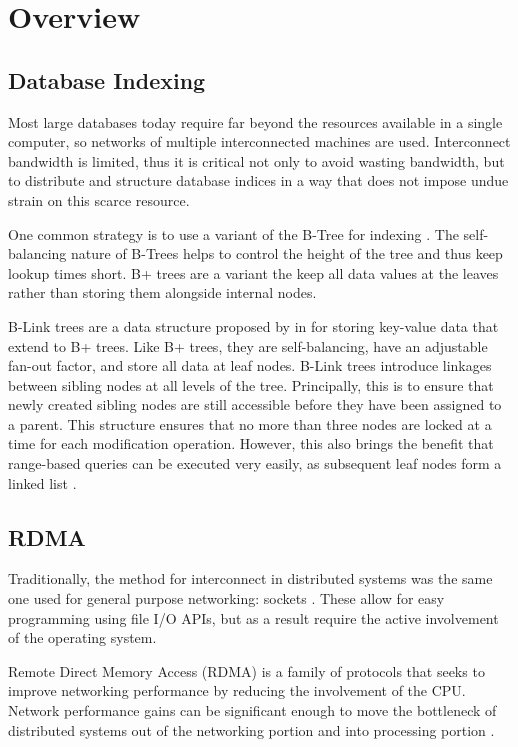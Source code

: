 \section{Overview}

\subsection{Database Indexing}
Most large databases today require far beyond the resources available in a single computer, so networks of multiple interconnected machines are used. Interconnect bandwidth is limited, thus it is critical not only to avoid wasting bandwidth, but to distribute and structure database indices in a way that does not impose undue strain on this scarce resource.

One common strategy is to use a variant of the B-Tree for indexing \autocite{ma-tpds-2022}. The self-balancing nature of B-Trees helps to control the height of the tree and thus keep lookup times short. B+ trees are a variant the keep all data values at the leaves rather than storing them alongside internal nodes.

B-Link trees are a data structure proposed by \citeauthor{b-link} in \citeyear{b-link} for storing key-value data that extend to B+ trees. Like B+ trees, they are self-balancing, have an adjustable fan-out factor, and store all data at leaf nodes.
B-Link trees introduce linkages between sibling nodes at all levels of the tree. Principally, this is to ensure that newly created sibling nodes are still accessible before they have been assigned to a parent. This structure ensures that no more than three nodes are locked at a time for each modification operation. However, this also brings the benefit that range-based queries can be executed very easily, as subsequent leaf nodes form a linked list \autocite{b-link}.


\subsection{RDMA}

Traditionally, the method for interconnect in distributed systems was the same one used for general purpose networking: sockets \autocite{binnig-vldb-2016}. These allow for easy programming using file I/O APIs, but as a result require the active involvement of the operating system.

Remote Direct Memory Access (RDMA) is a family of protocols that seeks to improve networking performance by reducing the involvement of the CPU. Network performance gains can be significant enough to move the bottleneck of distributed systems out of the networking portion and into processing portion \autocite{binnig-vldb-2016}.

